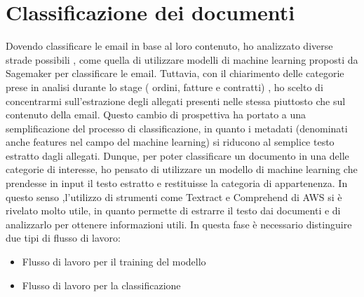 \section{Classificazione dei documenti}
\label{sec:classificazione-documenti}
Dovendo classificare le email in base al loro contenuto, ho analizzato diverse strade possibili , come quella di utilizzare modelli di machine learning proposti da Sagemaker per classificare le email. Tuttavia, con il chiarimento delle categorie prese in analisi durante lo stage ( ordini, fatture e contratti) , ho scelto di concentrarmi sull'estrazione degli allegati presenti nelle stessa piuttosto che sul contenuto della email. Questo cambio di prospettiva ha portato a una semplificazione del processo di classificazione, in quanto i metadati (denominati anche features nel campo del machine learning) si riducono al semplice testo estratto dagli allegati. Dunque, per poter classificare un documento in una delle categorie di interesse, ho pensato di utilizzare un modello di machine learning che prendesse in input il testo estratto e restituisse la categoria di appartenenza. In questo senso ,l'utilizzo di strumenti come Textract e Comprehend di AWS si è rivelato molto utile, in quanto permette di estrarre il testo dai documenti e di analizzarlo per ottenere informazioni utili.
 In questa fase è necessario distinguire due tipi di flusso di lavoro:
\begin{itemize}
    \item Flusso di lavoro per il training del modello
    \item Flusso di lavoro per la classificazione 
\end{itemize}
